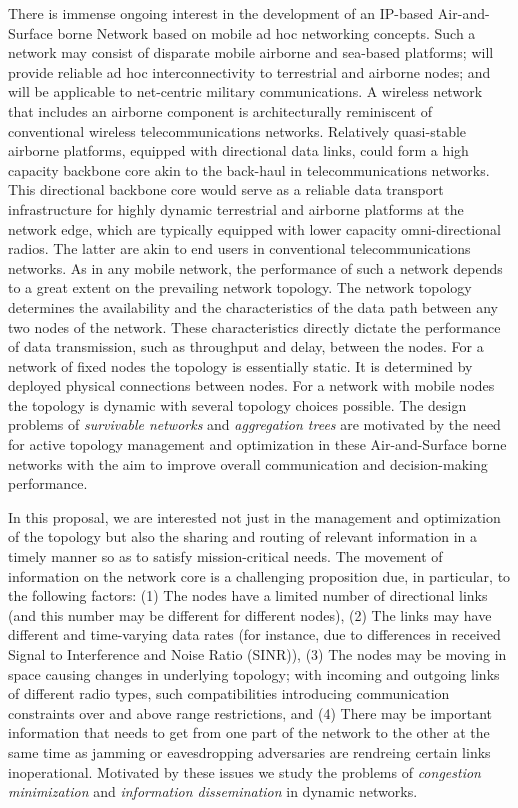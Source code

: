 There is immense ongoing interest in the development of an
IP-based Air-and-Surface borne Network based on mobile ad hoc
networking concepts. Such a network may consist of
disparate mobile airborne and sea-based platforms; will provide reliable ad
hoc interconnectivity to terrestrial and airborne nodes; and
will be applicable to net-centric military communications. A
wireless network that includes an airborne component is
architecturally reminiscent of conventional wireless
telecommunications networks. Relatively quasi-stable
airborne platforms, equipped with directional data links, could
form a high capacity backbone core akin to the back-haul in
telecommunications networks. This directional backbone core
would serve as a reliable data transport infrastructure for
highly dynamic terrestrial and airborne platforms at the
network edge, which are typically equipped with lower
capacity omni-directional radios. The latter are akin to end
users in conventional telecommunications networks.
As in any mobile network, the performance of such a network
depends to a great extent on the prevailing network topology.
The network topology determines the availability and the
characteristics of the data path between any two nodes of the
network. These characteristics directly dictate the performance
of data transmission, such as throughput and delay, between
the nodes. For a network of fixed nodes the topology is
essentially static. It is determined by deployed physical
connections between nodes. For a network with mobile nodes
the topology is dynamic with several topology choices
possible. The design problems of {\em survivable networks}
and {\em aggregation trees}  are motivated by the
need for active topology management and optimization in
these Air-and-Surface borne networks with
the aim to improve overall communication and decision-making performance.

In this proposal, we are interested not just in the management and
optimization of the topology but also the sharing and routing of
relevant information in a timely manner so as to satisfy mission-critical
needs. The movement of information on the network core is a challenging
proposition due, in particular, to the following factors: (1) The
nodes have a limited number of  directional links (and this
number may be different for different nodes), (2) The links
may have different and time-varying data rates (for instance, due to differences
in received Signal to Interference and Noise Ratio (SINR)),
(3) The nodes may be moving in space causing changes in underlying topology;
with incoming and outgoing links of different radio
types, such compatibilities introducing communication constraints over and above
range restrictions, and (4) There may be important information that needs
to get from one part of the network to the other at the same time as
jamming or eavesdropping adversaries are rendreing certain links inoperational.
Motivated by these issues we study the problems of {\em congestion
minimization} and {\em information dissemination} in dynamic networks.

